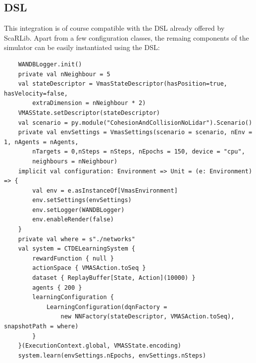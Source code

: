 \documentclass[12pt,a4paper,openright,twoside]{book}
\begin{document}
\subsection{DSL}
This integration is of course compatible with the DSL already offered by ScaRLib. Apart from a few configuration classes, the remaing components of the simulator can be 
easily instantiated using the DSL:
\begin{lstlisting}
    WANDBLogger.init()
    private val nNeighbour = 5
    val stateDescriptor = VmasStateDescriptor(hasPosition=true, hasVelocity=false, 
        extraDimension = nNeighbour * 2)
    VMASState.setDescriptor(stateDescriptor)
    val scenario = py.module("CohesionAndCollisionNoLidar").Scenario()
    private val envSettings = VmasSettings(scenario = scenario, nEnv = 1, nAgents = nAgents, 
        nTargets = 0,nSteps = nSteps, nEpochs = 150, device = "cpu", 
        neighbours = nNeighbour)
    implicit val configuration: Environment => Unit = (e: Environment) => {
        val env = e.asInstanceOf[VmasEnvironment]
        env.setSettings(envSettings)
        env.setLogger(WANDBLogger)
        env.enableRender(false)
    }
    private val where = s"./networks"
    val system = CTDELearningSystem {
        rewardFunction { null }
        actionSpace { VMASAction.toSeq }
        dataset { ReplayBuffer[State, Action](10000) }
        agents { 200 }
        learningConfiguration {
            LearningConfiguration(dqnFactory = 
                new NNFactory(stateDescriptor, VMASAction.toSeq), snapshotPath = where)
        }
    }(ExecutionContext.global, VMASState.encoding)
    system.learn(envSettings.nEpochs, envSettings.nSteps)
\end{lstlisting}
\end{document}

